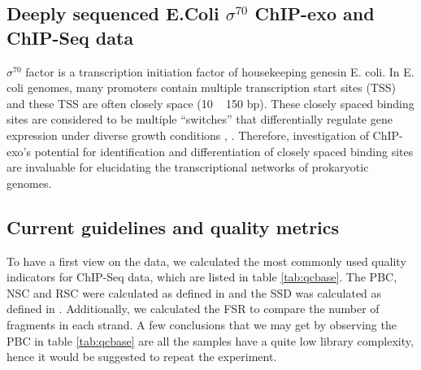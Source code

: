 \documentclass{bmcart}\usepackage[]{graphicx}\usepackage[]{color}
\begin{document}
\subsection{Deeply sequenced E.Coli $\sigma^{70}$ ChIP-exo and ChIP-Seq data}
\label{sec:ourdata}

$\sigma^{70}$ factor is a transcription initiation factor of
housekeeping genesin E. coli. In E. coli genomes, many promoters
contain multiple transcription start sites (TSS) and these TSS are
often closely space (10 ~ 150 bp). These closely spaced binding sites
are considered to be multiple ``switches'' that differentially
regulate gene expression under diverse growth conditions
\cite{regdb_old}, \cite{regulondb}. Therefore, investigation of
ChIP-exo's potential for identification and differentiation of closely
spaced binding sites are invaluable for elucidating the
transcriptional networks of prokaryotic genomes.

\subsection{Current guidelines and quality metrics}
\label{sec:qcnow}

To have a first view on the data, we calculated the most commonly used
quality indicators for ChIP-Seq data, which are listed in table
\ref{tab:qcbase}. The PBC, NSC and RSC were calculated as defined in
\cite{encode_qc} and the SSD was calculated as defined in
\cite{htseq}. Additionally, we calculated the FSR to compare the
number of fragments in each strand. A few conclusions that we may get
by observing the PBC in table \ref{tab:qcbase} are all the samples
have a quite low library complexity, hence it would be suggested to
repeat the experiment.
\end{document}
